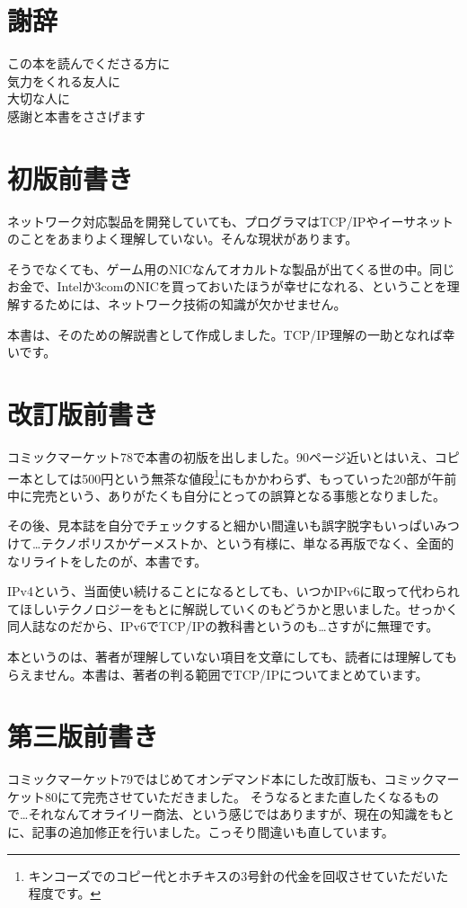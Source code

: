\section*{謝辞}
\begin{center}
この本を読んでくださる方に \\
気力をくれる友人に \\
大切な人に \\
感謝と本書をささげます
\end{center}

\section*{初版前書き}
ネットワーク対応製品を開発していても、プログラマはTCP/IPやイーサネットのことをあまりよく理解していない。そんな現状があります。

そうでなくても、ゲーム用のNICなんてオカルトな製品が出てくる世の中。同じお金で、Intelか3comのNICを買っておいたほうが幸せになれる、ということを理解するためには、ネットワーク技術の知識が欠かせません。

本書は、そのための解説書として作成しました。TCP/IP理解の一助となれば幸いです。


\section*{改訂版前書き}
コミックマーケット78で本書の初版を出しました。90ページ近いとはいえ、コピー本としては500円という無茶な値段\footnote{キンコーズでのコピー代とホチキスの3号針の代金を回収させていただいた程度です。}にもかかわらず、もっていった20部が午前中に完売という、ありがたくも自分にとっての誤算となる事態となりました。

その後、見本誌を自分でチェックすると細かい間違いも誤字脱字もいっぱいみつけて…テクノポリスかゲーメストか、という有様に、単なる再版でなく、全面的なリライトをしたのが、本書です。

IPv4という、当面使い続けることになるとしても、いつかIPv6に取って代わられてほしいテクノロジーをもとに解説していくのもどうかと思いました。せっかく同人誌なのだから、IPv6でTCP/IPの教科書というのも…さすがに無理です。

本というのは、著者が理解していない項目を文章にしても、読者には理解してもらえません。本書は、著者の判る範囲でTCP/IPについてまとめています。

\section*{第三版前書き}
コミックマーケット79ではじめてオンデマンド本にした改訂版も、コミックマーケット80にて完売させていただきました。
そうなるとまた直したくなるもので…それなんてオライリー商法、という感じではありますが、現在の知識をもとに、記事の追加修正を行いました。こっそり間違いも直しています。

